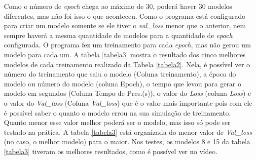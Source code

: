 Como o número de \textit{epoch} chega ao máximo de 30, poderá haver 30 modelos diferentes, mas não foi isso o que aconteceu. Como o programa está configurado para criar um modelo somente se ele tiver o \textit{val\_loss} menor que o anterior, nem sempre haverá a mesma quantidade de modelos para a quantidade de \textit{epoch} configurada. O programa fez um treinamento para cada \textit{epoch}, mas não gerou um modelo para cada um. A tabela \ref{tabela3} mostra o resultado dos cinco melhores modelos de cada treinamento realizado da Tabela \ref{tabela2}. Nela, é possível ver o número do treinamento que saiu o modelo (Coluna treinamento), a época do modelo ou número do modelo (coluna Epoch), o tempo que levou para gerar o modelo em segundos (Coluna Tempo de Prcs.(s)), o valor do \textit{Loss} (coluna \textit{Loss}) e o valor do \textit{Val\_loss} (Coluna \textit{Val\_loss}) que é o valor mais importante pois com ele é possível saber o quanto o modelo errou na sua simulação de treinamento. Quanto menor esse valor melhor poderá ser o modelo, mas isso só pode ser testado na prática. A tabela \ref{tabela3} está organizada do menor valor de \textit{Val\_loss} (no caso, o melhor modelo) para o maior. Nos testes, os modelos 8 e 15 da tabela \ref{tabela3} tiveram os melhores resultados, como é possível ver no vídeo.



